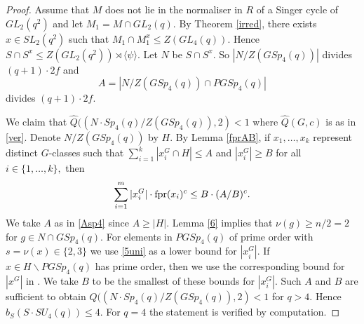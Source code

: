 \begin{proof}
Assume that $M$ does not lie in the normaliser in  $R$ of a Singer cycle of $GL_2(q^2)$ and let $M_1=M \cap GL_2(q).$ By Theorem \ref{irred}, there exists $x \in SL_2(q^2)$ such that $M_1 \cap M_1^x \le Z(GL_4(q))$. Hence $S \cap S^x \le Z(GL_2(q^2)) \rtimes \langle \psi \rangle.$ Let $N$ be  $S \cap S^x$.  So $|N/Z(GSp_4(q))|$ divides $(q+1)\cdot 2f$ and 
\begin{equation}
\label{Asp4}
A=|N/Z(GSp_4(q)) \cap PGSp_4(q)|
\end{equation} divides $(q+1)\cdot 2f$.   


We claim that $\hat{Q}((N \cdot Sp_4(q)/Z(GSp_4(q)),2)<1$ where  $\hat{Q}(G,c)$ is as in \eqref{ver}. Denote $N/Z(GSp_4(q))$ by $H$. By Lemma \ref{fprAB}, if  $x_1,\ldots,x_k$ represent distinct $G$-classes such that $\sum_{i=1}^k |x_i^G \cap  H| \le A$ and $|x_i^G| \ge B$ for all $i \in \{1, \ldots, k\},$ then
$$\sum_{i=1}^m |x_i^G| \cdot {\mathrm{fpr}} (x_i)^c \le B \cdot (A/B)^c.$$
We take $A$ as in \eqref{Asp4} since $A \ge |H|.$  Lemma \ref{6} implies that  $\nu(g)\ge n/2 =2$ for $g \in N \cap GSp_4(q)$. For elements in $PGSp_4(q)$ of prime order with $s=\nu(x) \in \{2,3\}$  we use \eqref{5uni} as a lower bound for $|x_i^G|$. If $x \in H \backslash PGSp_4(q)$ has prime order, then we use the corresponding bound for $|x^G|$ in \cite[Corollary 3.49]{fpr2}. We take $B$ to be
the smallest of these bounds for $|x_i^G|.$ Such $A$ and $B$ are sufficient to obtain $\hat{Q}((N \cdot Sp_4(q)/Z(GSp_4(q)),2)<1$  for $q>4.$ Hence $b_S(S \cdot SU_4(q)) \le 4$. For $q=4$ the statement is verified by computation. 
\end{proof}







